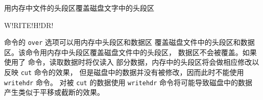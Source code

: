 \label{cmd:writehdr}

用内存中文件的头段区覆盖磁盘文字中的头段区

\begin{SACSTX}
W!RITE!H!DR!
\end{SACSTX}

 命令的 \texttt{over} 选项可以用内存中头段区和数据区
覆盖磁盘文件中的头段区和数据区。该命令用内存中头段区覆盖磁盘文件中的头段区，
数据区不会被覆盖。如果使用了  命令，读取数据时将仅读入
部分数据，内存中的头段区将会做相应修改以反映 \texttt{cut} 命令的效果，
但是磁盘中的数据并没有被修改，因而此时不能使用 \texttt{writehdr} 命令。
对被 \texttt{cut} 的数据使用 \texttt{writehdr} 命令将可能导致磁盘中的数据
产生类似于平移或截断的效果。
